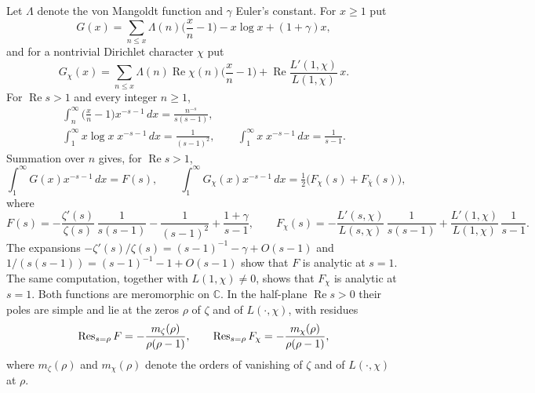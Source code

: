 Let $\Lambda$ denote the von Mangoldt function and $\gamma$ Euler's constant. For $x\ge1$ put
\begin{equation}\label{G}
G(x)=\sum_{n\le x}\Lambda(n)\Big(\frac xn-1\Big)-x\log x+(1+\gamma)x ,
\end{equation}
and for a nontrivial Dirichlet character $\chi$ put
\begin{equation}\label{Gchi}
G_\chi(x)=\sum_{n\le x}\Lambda(n)\operatorname{Re}\chi(n)\Big(\frac xn-1\Big)+\operatorname{Re}\frac{L'(1,\chi)}{L(1,\chi)}\,x .
\end{equation}
For $\operatorname{Re}s>1$ and every integer $n\ge1$,
\begin{gather*}
\int_n^\infty\Big(\frac xn-1\Big)x^{-s-1}\,dx=\frac{n^{-s}}{s(s-1)},\\
\int_1^\infty x\log x\;x^{-s-1}\,dx=\frac1{(s-1)^2},\qquad
\int_1^\infty x\;x^{-s-1}\,dx=\frac1{s-1}.
\end{gather*}
Summation over $n$ gives, for $\operatorname{Re}s>1$,
\begin{equation}\label{F}
\int_1^\infty G(x)x^{-s-1}\,dx=F(s),\qquad \int_1^\infty G_\chi(x)x^{-s-1}\,dx=\tfrac12\big(F_\chi(s)+F_{\bar\chi}(s)\big),
\end{equation}
where
\begin{equation}\label{Fchi}
F(s)=-\frac{\zeta'(s)}{\zeta(s)}\,\frac1{s(s-1)}-\frac1{(s-1)^2}+\frac{1+\gamma}{s-1},\qquad
F_\chi(s)=-\frac{L'(s,\chi)}{L(s,\chi)}\,\frac1{s(s-1)}+\frac{L'(1,\chi)}{L(1,\chi)}\,\frac1{s-1}.
\end{equation}
The expansions $-\zeta'(s)/\zeta(s)=(s-1)^{-1}-\gamma+O(s-1)$ and $1/(s(s-1))=(s-1)^{-1}-1+O(s-1)$ show that $F$ is analytic at $s=1$. The same computation, together with $L(1,\chi)\ne0$, shows that $F_\chi$ is analytic at $s=1$. Both functions are meromorphic on $\mathbb C$. In the half-plane $\operatorname{Re}s>0$ their poles are simple and lie at the zeros $\rho$ of $\zeta$ and of $L(\cdot,\chi)$, with residues
\begin{equation}\label{res}
\operatorname{Res}_{s=\rho}F=-\frac{m_\zeta(\rho)}{\rho(\rho-1)},\qquad \operatorname{Res}_{s=\rho}F_\chi=-\frac{m_\chi(\rho)}{\rho(\rho-1)},
\end{equation}
where $m_\zeta(\rho)$ and $m_\chi(\rho)$ denote the orders of vanishing of $\zeta$ and of $L(\cdot,\chi)$ at $\rho$.

